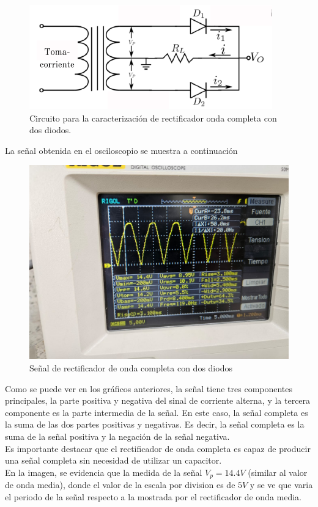 \documentclass[10pt,letterpaper]{article}
\begin{document}
\begin{figure}[H]
	\centering
	\includegraphics[scale=1.2]{OndaCompleta2.png}
	\caption{Circuito para la caracterización de rectificador onda completa con dos diodos.}
	\label{fig:OndaCompleta2}
\end{figure}

La señal obtenida en el osciloscopio se muestra a continuación

\begin{figure}[H]
	\centering
	\includegraphics[scale=.35]{Osc_OndaCompleta.jpg}
	\caption{Señal de rectificador de onda completa con dos diodos}
	\label{fig:OndaCompleta}
\end{figure}

Como se puede ver en los gráficos anteriores, la señal tiene tres componentes principales,
la parte positiva y negativa del sinal de corriente alterna, y la tercera componente es la
parte intermedia de la señal. En este caso, la señal completa es la suma de las dos partes
positivas y negativas. Es decir, la señal completa es la suma de la señal positiva y la
negación de la señal negativa.\\
Es importante destacar que el rectificador de onda completa es capaz de producir una señal
completa sin necesidad de utilizar un capacitor.\\
En la imagen, se evidencia que la medida de la señal $V_p=14.4 V$ (similar al valor de onda media), donde
el valor de la escala por division es de $5V$ y se ve que varia el periodo de la señal respecto a la mostrada por el rectificador de onda media.\\
\end{document}
